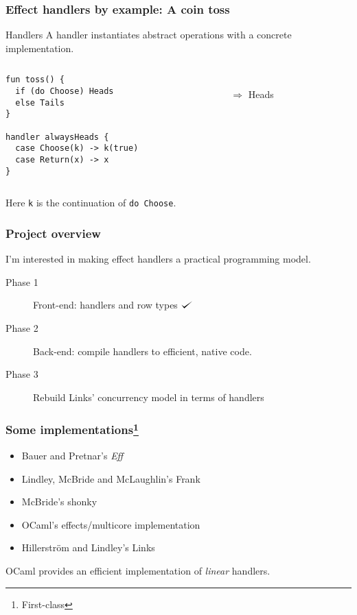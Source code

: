 \documentclass[10pt,compress]{beamer}
\def\checkmark{\tikz\fill[scale=0.4](0,.35) -- (.25,0) -- (1,.7) -- (.25,.15) -- cycle;}
\begin{document}
\begin{frame}[fragile]
  \frametitle{Effect handlers by example: A coin toss}
\begin{block}{Handlers}
A handler instantiates abstract operations with a concrete implementation.
\end{block}
\begin{columns}
\begin{column}{0.5\textwidth}
\begin{lstlisting}
fun toss() {
  if (do Choose) Heads
  else Tails
}

handler alwaysHeads {
  case Choose(k) -> k(true)
  case Return(x) -> x
}
\end{lstlisting}
\end{column}
\begin{column}{0.5\textwidth}
\\
$\Longrightarrow$ Heads
\end{column}
\end{columns}
Here \lstinline$k$ is the continuation of \lstinline$do Choose$.
\end{frame}

\begin{frame}
  \frametitle{Project overview}
I'm interested in making effect handlers a practical programming model.
\begin{description}
  \item[Phase 1] Front-end: handlers and row types $\checkmark$
  \item[Phase 2] Back-end: compile handlers to efficient, native code.
  \item[Phase 3] Rebuild Links' concurrency model in terms of handlers
\end{description}
\end{frame}

\begin{frame}
  \frametitle{Some implementations\footnote{First-class}}
\begin{itemize}
  \item Bauer and Pretnar's \emph{Eff} 
  \item Lindley, McBride and McLaughlin's Frank
  \item McBride's shonky
  \item OCaml's effects/multicore implementation
  \item Hillerström and Lindley's Links
\end{itemize}
OCaml provides an efficient implementation of \emph{linear} handlers.
\end{frame}
\end{document}
